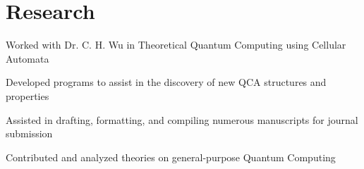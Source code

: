 \documentclass[]{deedy-resume-openfont}
\begin{document}
\begin{minipage}[t]{0.66\textwidth}
\section{Research}
\begin{tightemize}
	\item Worked with Dr. C. H. Wu in Theoretical Quantum Computing using Cellular Automata
	\item Developed programs to assist in the discovery of new QCA structures and properties
	\item Assisted in drafting, formatting, and compiling numerous manuscripts for journal submission
	\item Contributed and analyzed theories on general-purpose Quantum Computing
\end{tightemize}
	



\end{minipage} 
\end{document}
